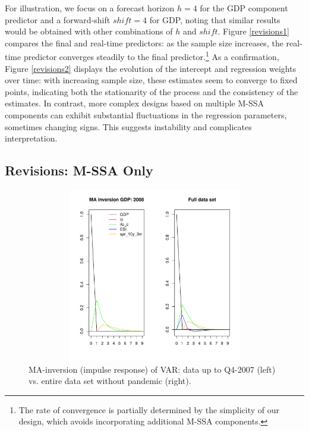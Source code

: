 \documentclass[11pt,a4paper]{article}
\begin{document}
For illustration, we focus on a forecast horizon $h=4$ for the GDP component predictor and a forward-shift $shift=4$ for GDP, noting that similar results would be obtained with other combinations of $h$ and $shift$. 
Figure \ref{revisions1} compares the final and real-time predictors: as the sample size increases, the real-time predictor converges steadily to the final predictor.\footnote{The rate of convergence is partially determined by the simplicity of our design, which avoids incorporating additional M-SSA components.} 
As a confirmation, Figure \ref{revisions2} displays the evolution of the intercept and regression weights over time: with increasing sample size, these estimates seem to converge to fixed points, indicating both the stationarity of the process and the consistency of the estimates. %
In contrast, more complex designs based on multiple M-SSA components can exhibit substantial fluctuations in the regression parameters, sometimes changing signs. This suggests instability and complicates interpretation.

\subsection{Revisions: M-SSA Only}


\begin{figure}[h!]
    \begin{center}
        \includegraphics[height=3in, width=4.5in]{./Figures/up_dated_ma_inv_multi_ip.pdf}
        \caption{MA-inversion (impulse response) of VAR: data up to Q4-2007 (left) vs. entire data set without pandemic (right).
        \label{up_dated_ma_inv_multi_ip}}
    \end{center}
\end{figure}
\end{document}
